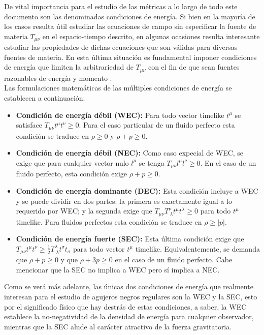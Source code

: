 \documentclass{article}
\numberwithin{equation}{section}
\begin{document}
De vital importancia para el estudio de las métricas a lo largo de todo este documento son las denominadas condiciones de energía. Si bien en la mayoría de los casos resulta útil estudiar las ecuaciones de campo sin especificar la fuente de materia $T_{\mu \nu}$ en el espacio-tiempo descrito, en algunas ocasiones resulta interesante estudiar las propiedades de dichas ecuaciones que son válidas para diversas fuentes de materia. En esta última situación es fundamental imponer condiciones de energía que limiten la arbitrariedad de $T_{\mu \nu}$ con el fin de que sean fuentes razonables de energía y momento \cite{carroll}.\\

Las formulaciones matemáticas de las múltiples  condiciones de energía se establecen a continuación:

\begin{itemize}
\item \textbf{Condición de energía débil (WEC):} Para todo vector timelike $t^\mu$ se satisface $T_{\mu \nu}t^{\mu}t^{\nu} \geq 0$. Para el caso particular de un fluido perfecto esta condición se traduce en $\rho \geq 0$ y $\rho + p \geq 0$.

\item \textbf{Condición de energía débil (NEC):} Como caso expecial de WEC, se exige que para cualquier vector nulo $l^\mu$ se tenga $T_{\mu \nu}l^{\mu}l^{\nu} \geq 0$. En el caso de un fluido perfecto, esta condición exige $\rho + p \geq 0$.

\item \textbf{Condición de energía dominante (DEC):} Esta condición incluye a WEC y se puede dividir en dos partes: la primera es exactamente igual a lo requerido por WEC; y la segunda exige que $T_{\mu \nu}T^{\nu}_{\ \lambda}t^{\mu}t^{\lambda} \geq 0$ para todo $t^{\mu}$ timelike. Para fluidos perfectos esta condición se traduce en $\rho \geq |p|$.

\item \textbf{Condición de energía fuerte (SEC):} Esta última condición exige que $T_{\mu \nu}t^{\mu}t^{\nu} \geq \frac{1}{2}T^{\lambda}_{\ \lambda}t^{\sigma}t_{\sigma}$ para todo vector $t^\mu$ timelike. Equivalentemente, se demanda que $\rho + p \geq 0$ y que $\rho + 3p \geq 0$ en el caso de un fluido perfecto. Cabe mencionar que la SEC no implica a WEC pero sí implica a NEC.
\end{itemize}

Como se verá más adelante, las únicas dos condiciones de energía que realmente interesan para el estudio de agujeros negros regulares son la WEC y la SEC, esto por el significado físico que hay destrás de estas condiciones, a saber, la WEC establece la no-negatividad de la densidad de energía para cualquier observador, mientras que la SEC alude al carácter atractivo de la fuerza gravitatoria.\\
\end{document}
